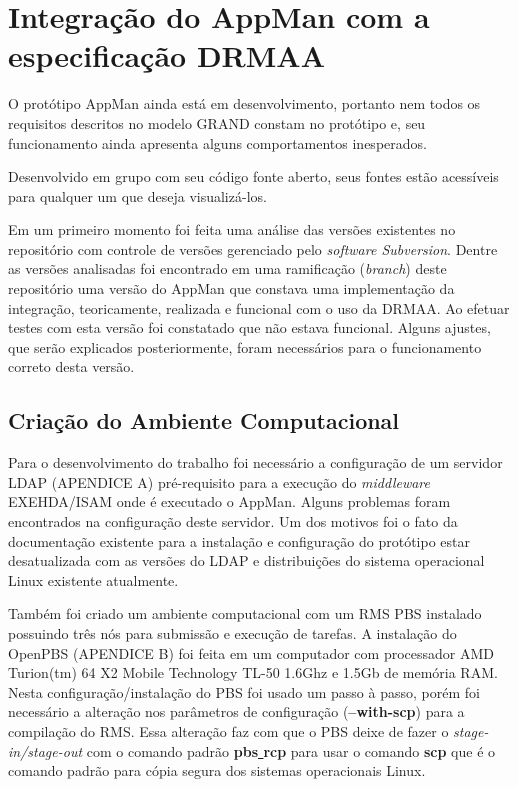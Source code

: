 \chapter{Integração do AppMan com a especificação DRMAA}
\label{cap:implementacao}

O protótipo AppMan ainda está em desenvolvimento, portanto nem todos os requisitos descritos no modelo GRAND constam no protótipo e, seu funcionamento ainda apresenta alguns comportamentos inesperados. 

Desenvolvido em grupo com seu código fonte aberto, seus fontes estão acessíveis para qualquer um que deseja visualizá-los. 

Em um primeiro momento foi feita uma análise das versões existentes no repositório com controle de versões gerenciado pelo \emph{software Subversion}. Dentre as versões analisadas foi encontrado em uma ramificação (\emph{branch}) deste repositório uma versão do AppMan que constava uma implementação da integração, teoricamente, realizada e funcional com o uso da DRMAA. Ao efetuar testes com esta versão foi constatado que não estava funcional. Alguns ajustes, que serão explicados posteriormente, foram necessários para o funcionamento correto desta versão.

\section{Criação do Ambiente Computacional}

Para o desenvolvimento do trabalho foi necessário a configuração de um servidor LDAP (APENDICE A) pré-requisito para a execução do \emph{middleware} EXEHDA/ISAM onde é executado o AppMan. Alguns problemas foram encontrados na configuração deste servidor. Um dos motivos foi o fato da documentação existente para a instalação e configuração do protótipo estar desatualizada com as versões do LDAP e distribuições do sistema operacional Linux existente atualmente. 

Também foi criado um ambiente computacional com um RMS PBS instalado possuindo três nós para submissão e execução de tarefas. A instalação do OpenPBS (APENDICE B) foi feita em um computador com processador AMD Turion(tm) 64 X2 Mobile Technology TL-50 1.6Ghz e 1.5Gb de memória RAM. Nesta configuração/instalação do PBS foi usado um passo à passo, porém foi necessário a alteração nos parâmetros de configuração (\textbf{--with-scp}) para a compilação do RMS. Essa alteração faz com que o PBS deixe de fazer o \emph{stage-in/stage-out} com o comando padrão \textbf{pbs\underline{ }rcp} para usar o comando \textbf{scp} que é o comando padrão para cópia segura dos sistemas operacionais Linux.

